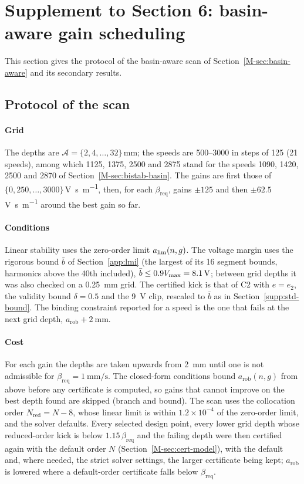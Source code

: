 \section{Supplement to Section 6: basin-aware gain scheduling}\label{supp:ba}

This section gives the protocol of the basin-aware scan of Section~\ref{M-sec:basin-aware} and its secondary results.

\subsection{Protocol of the scan}\label{supp:ba-protocol}

\paragraph{Grid} The depths are $\mathcal A=\{2,4,\dots,32\}$\,\si{\milli\metre}; the speeds are 500--\SI{3000}{\rpm} in steps of \SI{125}{\rpm} (21 speeds), among which 1125, 1375, 2500 and \SI{2875}{\rpm} stand for the speeds 1090, 1420, 2500 and \SI{2870}{\rpm} of Section~\ref{M-sec:bistab-basin}. The gains are first those of $\{0,250,\dots,3000\}$\,\si{\volt\second\per\metre}, then, for each $\beta_{\mathrm{req}}$, gains $\pm125$ and then $\pm62.5$\,\si{\volt\second\per\metre} around the best gain so far.

\paragraph{Conditions} Linear stability uses the zero-order limit $a_{\lim}(n,g)$. The voltage margin uses the rigorous bound $\bar b$ of Section~\ref{app:lmi} (the largest of its 16 segment bounds, harmonics above the 40th included), $\bar b\le0.9V_{\max}=\SI{8.1}{\volt}$; between grid depths it was also checked on a \SI{0.25}{\milli\metre} grid. The certified kick is that of C2 with $e=e_2$, the validity bound $\delta=0.5$ and the \SI{9}{\volt} clip, rescaled to $\bar b$ as in Section~\ref{supp:std-bound}. The binding constraint reported for a speed is the one that fails at the next grid depth, $a_{\mathrm{rob}}+\SI{2}{\milli\metre}$.

\paragraph{Cost} For each gain the depths are taken upwards from \SI{2}{\milli\metre} until one is not admissible for $\beta_{\mathrm{req}}=\SI{1}{\milli\metre\per\second}$. The closed-form conditions bound $a_{\mathrm{rob}}(n,g)$ from above before any certificate is computed, so gains that cannot improve on the best depth found are skipped (branch and bound). The scan uses the collocation order $N_{\mathrm{red}}=N-8$, whose linear limit is within $1.2\times10^{-4}$ of the zero-order limit, and the solver defaults. Every selected design point, every lower grid depth whose reduced-order kick is below $1.15\,\beta_{\mathrm{req}}$ and the failing depth were then certified again with the default order $N$ (Section~\ref{M-sec:cert-model}), with the default and, where needed, the strict solver settings, the larger certificate being kept; $a_{\mathrm{rob}}$ is lowered where a default-order certificate falls below $\beta_{\mathrm{req}}$.

